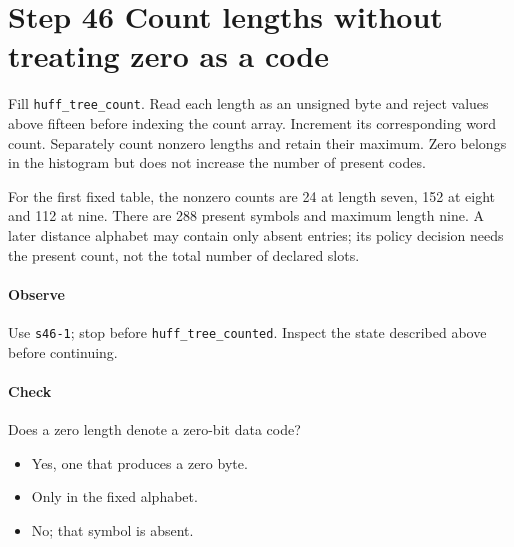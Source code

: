 \section{Step 46 Count lengths without treating zero as a code}\label{png-huff-s46}
Fill \texttt{huff\_tree\_count}. Read each length as an unsigned byte and reject values above fifteen before indexing the count array. Increment its corresponding word count. Separately count nonzero lengths and retain their maximum. Zero belongs in the histogram but does not increase the number of present codes.

For the first fixed table, the nonzero counts are 24 at length seven, 152 at eight and 112 at nine. There are 288 present symbols and maximum length nine. A later distance alphabet may contain only absent entries; its policy decision needs the present count, not the total number of declared slots.

\paragraph{Observe} Use \texttt{s46-1}; stop before \texttt{huff\_tree\_counted}. Inspect the state described above before continuing.

\paragraph{Check} Does a zero length denote a zero-bit data code?
\begin{itemize}
  \item[A.] Yes, one that produces a zero byte.
  \item[B.] Only in the fixed alphabet.
  \item[C.] No; that symbol is absent.
\end{itemize}
